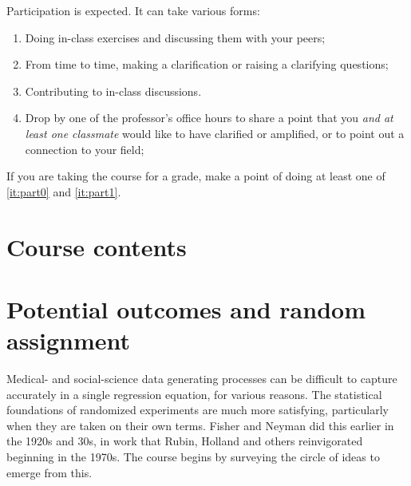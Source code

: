 \documentclass[12pt]{article}
\begin{document}
Participation is expected. It can take various forms:
\begin{enumerate}
\item Doing in-class exercises and discussing them with your peers;
\item From time to time, making a clarification or raising a clarifying questions;
\item \label{it:part0} Contributing to in-class discussions.
\item \label{it:part1} Drop by one of the professor's office hours to share a point that you \textit{and at least one classmate} would like to have clarified or amplified, or to point out a connection to your field;
\end{enumerate}
If you are taking the course for a grade, make a point of doing at
least one of \ref{it:part0} and \ref{it:part1}. %


\section*{Course contents}

\section{Potential outcomes and random assignment}

Medical- and social-science data generating processes can be difficult to
capture accurately in a single regression equation, for various reasons.
The statistical foundations of randomized experiments are much more
satisfying, particularly when they are taken on their own
terms. Fisher and Neyman did this earlier in the 1920s and 30s, in
work that Rubin, Holland and others reinvigorated beginning in the
1970s. The course begins by surveying the circle of ideas to emerge
from this.
\end{document}
